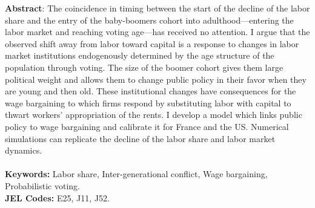 \noindent \textbf{Abstract}: The coincidence in timing between the start of the decline of the labor share and the entry of the baby-boomers cohort into adulthood---entering the labor market and reaching voting age---has received no attention. I argue that the observed shift away from labor toward capital is a response to changes in labor market institutions endogenously determined by the age structure of the population through voting. The size of the boomer cohort gives them large political weight and allows them to change public policy in their favor when they are young and then old. These institutional changes have consequences for the wage bargaining to which firms respond by substituting labor with capital to thwart workers’ appropriation of the rents. I develop a model which links public policy to wage bargaining and calibrate it for France and the US. Numerical simulations can replicate the decline of the labor share and labor market dynamics.\\
\vspace{1em}\\
\noindent\textbf{Keywords:} Labor share, Inter-generational conflict, Wage bargaining, Probabilistic voting.\\
\noindent\textbf{JEL Codes:} E25, J11, J52.

\clearpage
\chaptertoc{}

\pagebreak

